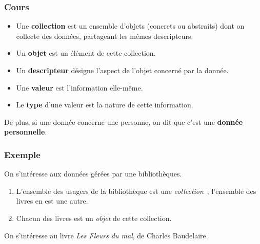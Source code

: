 \documentclass[14pt, aspectratio=43]{beamer}
\begin{document}
\begin{frame}
\frametitle{Cours}
   \begin{itemize}
   \item Une \textbf{collection} est un ensemble d'objets (concrets ou abstraits) dont on collecte des données, partageant les mêmes descripteurs.
   \item Un \textbf{objet} est un élément de cette collection.
   \item Un \textbf{descripteur} désigne l'aspect de l'objet concerné par la donnée.
   \item Une \textbf{valeur} est l'information elle-même.
   \item Le \textbf{type} d'une valeur est la nature de cette information.
   \end{itemize}
   De plus, si une donnée concerne une personne, on dit que c'est une \textbf{donnée personnelle}.
\end{frame}

\begin{frame}
\frametitle{Exemple}
  On s'intéresse aux données gérées par une bibliothèques.
 
 \begin{enumerate}
 \item L'ensemble des usagers de la bibliothèque est une \emph{collection} ; l'ensemble des livres en est une autre.
 \item Chacun des livres est un \emph{objet} de cette collection.
 \end{enumerate}

On s'intéresse au livre \emph{Les Fleurs du mal}, de Charles Baudelaire.
\end{frame}
\end{document}
